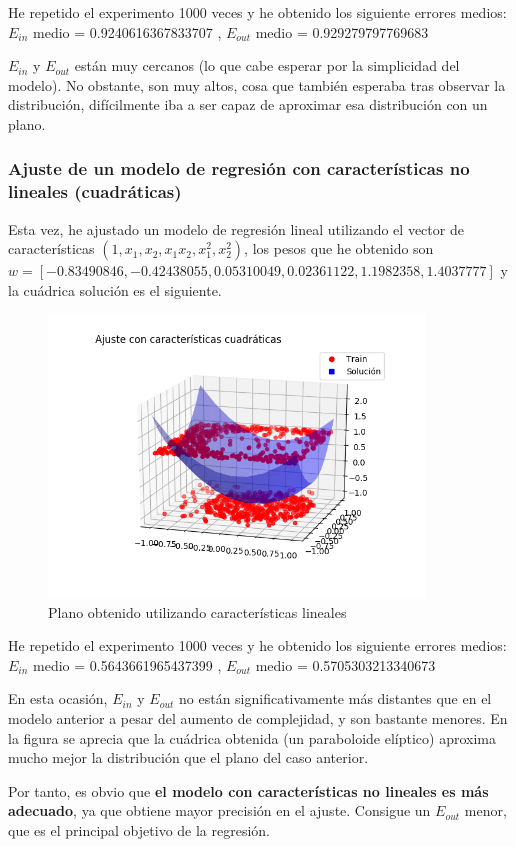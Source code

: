 \documentclass[a4]{article}
\begin{document}
\vspace{-5mm}

He repetido el experimento 1000 veces y he obtenido los siguiente 
errores medios: \\
$E_{in}$ medio =  0.9240616367833707 ,\qquad
$E_{out}$ medio =  0.929279797769683

$E_{in}$ y $E_{out}$ están muy cercanos (lo que cabe esperar por la simplicidad del modelo).
No obstante, son muy altos, cosa que también esperaba tras observar la 
distribución, difícilmente iba a ser capaz de aproximar esa distribución con un plano.

\subsubsection{Ajuste de un modelo de regresión con características no lineales (cuadráticas)}

Esta vez, he ajustado un modelo de regresión lineal utilizando el vector de características
$(1,x_1,x_2,x_1 x_2,x_1^2,x_2^2)$, los pesos que he obtenido son
$w = [-0.83490846,-0.42438055,0.05310049,0.02361122,1.1982358,1.4037777]$
y la cuádrica solución es el siguiente. \vspace{-4mm}

\begin{figure}[H]
    \centering    
    \includegraphics[width=100mm]{imgs/regress-nolin.png}
    \caption{Plano obtenido utilizando características lineales}
    \label{fig:regress-nolin}
\end{figure}

\vspace{-5mm}

He repetido el experimento 1000 veces y he obtenido los siguiente 
errores medios: \\
$E_{in}$ medio =  0.5643661965437399 , \qquad
$E_{out}$ medio =  0.5705303213340673

En esta ocasión, $E_{in}$ y $E_{out}$ no están significativamente más distantes
que en el modelo anterior a pesar del aumento de complejidad, y son bastante
menores. En la figura se aprecia que la cuádrica obtenida (un paraboloide elíptico) aproxima mucho mejor la distribución que el plano del caso anterior.

Por tanto, es obvio que \textbf{el modelo con características no lineales es más adecuado},
ya que obtiene mayor precisión en el ajuste. Consigue un $E_{out}$ menor, que
es el principal objetivo de la regresión.
\end{document}
